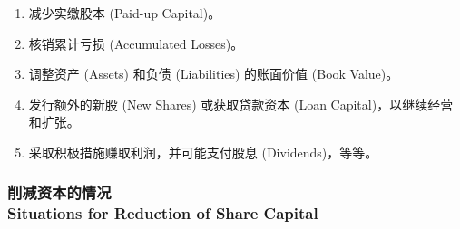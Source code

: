 \documentclass{article}
\begin{document}
\begin{enumerate}
    \item 减少实缴股本 (Paid-up Capital)。
    \item 核销累计亏损 (Accumulated Losses)。
    \item 调整资产 (Assets) 和负债 (Liabilities) 的账面价值 (Book Value)。
    \item 发行额外的新股 (New Shares) 或获取贷款资本 (Loan Capital)，以继续经营和扩张。
    \item 采取积极措施赚取利润，并可能支付股息 (Dividends)，等等。
\end{enumerate}

\subsubsection{削减资本的情况\\Situations for Reduction of Share Capital}
\end{document}
